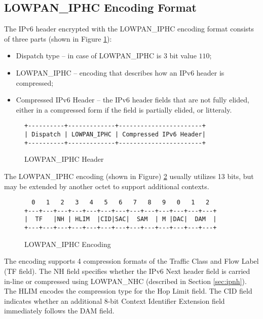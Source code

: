 \documentclass[a4paper,11pt,oneside]{article}
\newenvironment{mylisting}
{\begin{list}{}{\setlength{\leftmargin}{1em}}\item\footnotesize\bfseries}
{\end{list}}
\begin{document}
\subsection{LOWPAN\_IPHC Encoding Format}
The IPv6 header encrypted with the LOWPAN\_IPHC encoding format consists of three parts (shown in Figure \ref{fig:lowpaniphc}):
\begin{itemize}
\item Dispatch type -- in case of LOWPAN\_IPHC is 3 bit value $110$;
\item LOWPAN\_IPHC -- encoding that describes how an IPv6 header is compressed;
\item Compressed IPv6 Header -- the IPv6 header fields that are not fully elided, either in a compressed form if the field is partially elided, or litteraly.
\end{itemize}
\begin{figure}[htp]
\centering
\begin{mylisting}
\begin{verbatim}
+----------+-------------+-----------------------+
| Dispatch | LOWPAN_IPHC | Compressed IPv6 Header|
+----------+-------------+-----------------------+
\end{verbatim}
\end{mylisting}
\caption{LOWPAN\_IPHC Header}\label{fig:lowpaniphc}
\end{figure}

The LOWPAN\_IPHC encoding (shown in Figure) \ref{fig:lowpanbe} usually utilizes 13 bits, but may be extended by another octet to support additional contexts. 
\begin{figure}[htp]
\centering
\begin{mylisting}
\begin{verbatim}
  0   1   2   3   4   5   6   7   8   9   0   1   2  
+---+---+---+---+---+---+---+---+---+---+---+---+---+
|  TF   |NH | HLIM  |CID|SAC|  SAM  | M |DAC|  DAM  |
+---+---+---+---+---+---+---+---+---+---+---+---+---+
\end{verbatim}
\end{mylisting}
\caption{LOWPAN\_IPHC Encoding}\label{fig:lowpanbe}
\end{figure}

The encoding supports 4 compression formats of the Traffic Class and Flow Label (TF field). The
NH field specifies whether the IPv6 Next header field is carried in-line or compressed using LOWPAN\_NHC (described in Section \ref{sec:ipnh}). The HLIM encodes the compression type for the Hop Limit field. The CID field indicates
whether an additional 8-bit Context Identifier Extension field immediately follows the DAM field. 
\end{document}
